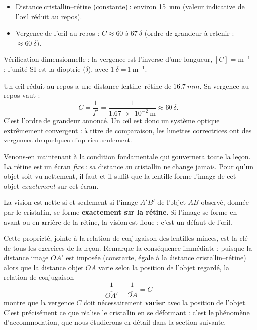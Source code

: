 \documentclass[11pt]{article}
\newcommand{\cle}[1]{{\popxbold\color{popdark}#1}}
\begin{document}
\begin{aretenir}
\begin{itemize}
\item Distance cristallin--rétine (constante) : environ \SI{15}{mm} (valeur indicative de l'œil réduit au repos).
\item Vergence de l'œil au repos : $C \approx 60$ à $\SI{67}{\delta}$ (ordre de grandeur à retenir : $\approx \SI{60}{\delta}$).
\end{itemize}
Vérification dimensionnelle : la vergence est l'inverse d'une longueur, $[C] = \mathrm{m}^{-1}$ ; l'unité SI est la dioptrie ($\delta$), avec $1\ \delta = 1\ \mathrm{m}^{-1}$.
\end{aretenir}

\begin{exemplebox}
Un œil réduit au repos a une distance lentille--rétine de $\SI{16,7}{mm}$. Sa vergence au repos vaut :
\[ C = \frac{1}{f'} = \frac{1}{\num{1,67e-2}\ \mathrm{m}} \approx \SI{60}{\delta}. \]
C'est l'ordre de grandeur annoncé. Un œil est donc un système optique extrêmement convergent : à titre de comparaison, les lunettes correctrices ont des vergences de quelques dioptries seulement.
\end{exemplebox}

Venons-en maintenant à la condition fondamentale qui gouvernera toute la leçon. La rétine est un écran \emph{fixe} : sa distance au cristallin ne change jamais. Pour qu'un objet soit vu nettement, il faut et il suffit que la lentille forme l'image de cet objet \emph{exactement} sur cet écran.

\begin{propriete}
La vision est nette si et seulement si l'image $A'B'$ de l'objet $AB$ observé, donnée par le cristallin, se forme \textbf{exactement sur la rétine}. Si l'image se forme en avant ou en arrière de la rétine, la vision est floue : c'est un défaut de l'œil.
\end{propriete}

Cette propriété, jointe à la relation de conjugaison des lentilles minces, est la clé de tous les exercices de la leçon. Remarque la conséquence immédiate : puisque la distance image $\overline{OA'}$ est imposée (constante, égale à la distance cristallin--rétine) alors que la distance objet $\overline{OA}$ varie selon la position de l'objet regardé, la relation de conjugaison
\[ \frac{1}{\overline{OA'}} - \frac{1}{\overline{OA}} = C \]
montre que la vergence $C$ doit nécessairement \textbf{varier} avec la position de l'objet. C'est précisément ce que réalise le cristallin en se déformant : c'est le phénomène d'\cle{accommodation}, que nous étudierons en détail dans la section suivante.
\end{document}
